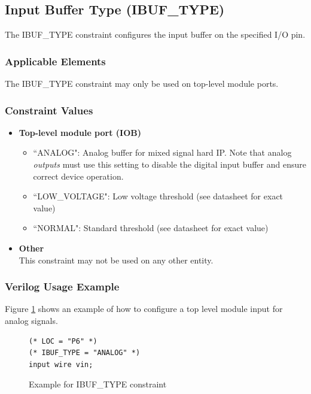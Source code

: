 \documentclass[11pt]{article}
\begin{document}

\pagebreak
\subsection{Input Buffer Type (IBUF\_TYPE)}

The IBUF\_TYPE constraint configures the input buffer on the specified I/O pin.

\subsubsection{Applicable Elements}
The IBUF\_TYPE constraint may only be used on top-level module ports. 

\subsubsection{Constraint Values}
\begin{itemize}
\item {\bfseries Top-level module port (IOB)}
	\begin{itemize}
		\item ``ANALOG": Analog buffer for mixed signal hard IP. Note that analog \emph{outputs} must use this setting
		to disable the digital input buffer and ensure correct device operation.
		\item ``LOW\_VOLTAGE": Low voltage threshold (see datasheet for exact value)
		\item ``NORMAL": Standard threshold (see datasheet for exact value)
	\end{itemize}
\item {\bfseries Other} \\
This constraint may not be used on any other entity.
\end{itemize}

\subsubsection{Verilog Usage Example}

Figure \ref{constraint-ibuftype} shows an example of how to configure a top level module input for analog signals.

\begin{figure}[h]
\begin{lstlisting}
(* LOC = "P6" *)
(* IBUF_TYPE = "ANALOG" *)
input wire vin;
\end{lstlisting}
\caption{Example for IBUF\_TYPE constraint}
\label{constraint-ibuftype}
\end{figure}
\end{document}
